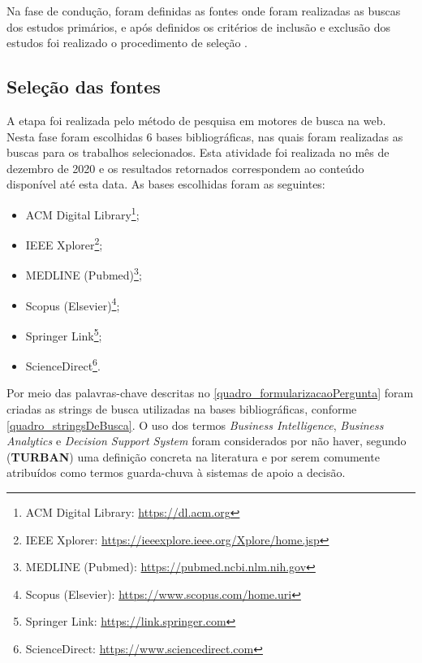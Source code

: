 Na fase de condução, foram definidas as fontes onde foram realizadas as buscas dos estudos primários, e após definidos os critérios de inclusão e exclusão dos estudos foi realizado o procedimento de seleção \cite{biolchini2005}. 


\subsection{Seleção das fontes}

A etapa foi realizada pelo método de pesquisa em motores de busca na web. Nesta fase foram escolhidas 6 bases bibliográficas, nas quais foram realizadas as buscas para os trabalhos selecionados. Esta atividade foi realizada no mês de dezembro de 2020 e os resultados retornados correspondem ao conteúdo disponível até esta data. As bases escolhidas foram as seguintes:
\begin{itemize}
 \item ACM Digital Library\footnote{ACM Digital Library: \url{https://dl.acm.org}};
 \item IEEE Xplorer\footnote{IEEE Xplorer: \url{https://ieeexplore.ieee.org/Xplore/home.jsp}};
 \item MEDLINE (Pubmed)\footnote{MEDLINE (Pubmed): \url{https://pubmed.ncbi.nlm.nih.gov}};
 \item Scopus (Elsevier)\footnote{Scopus (Elsevier): \url{https://www.scopus.com/home.uri}};
 \item Springer Link\footnote{Springer Link: \url{https://link.springer.com}};
 \item ScienceDirect\footnote{ScienceDirect: \url{https://www.sciencedirect.com}}.
\end{itemize}

Por meio das palavras-chave descritas no \autoref{quadro_formularizacaoPergunta} foram criadas as strings de busca utilizadas na bases bibliográficas, conforme \autoref{quadro_stringsDeBusca}. O uso dos termos \textit{Business Intelligence}, \textit{Business Analytics} e \textit{Decision Support System} foram considerados por não haver, segundo (\textbf{TURBAN}) uma definição concreta na literatura e por serem comumente atribuídos como termos guarda-chuva à sistemas de apoio a decisão. 

